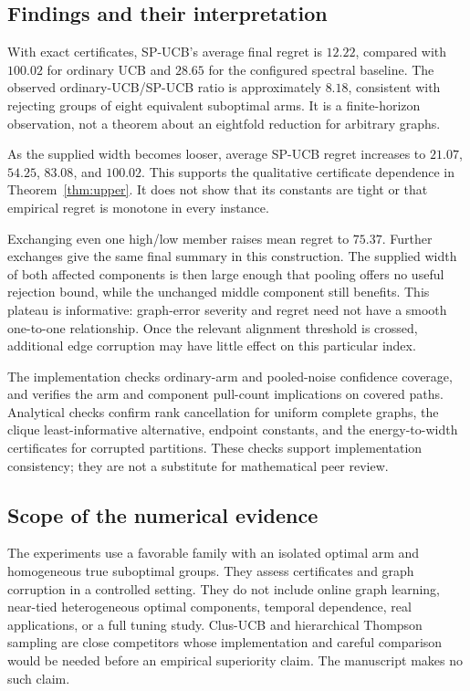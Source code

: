 \documentclass[11pt]{article}
\begin{document}
\subsection{Findings and their interpretation}
With exact certificates, SP-UCB's average final regret is $12.22$, compared with $100.02$ for ordinary UCB and $28.65$ for the configured spectral baseline. The observed ordinary-UCB/SP-UCB ratio is approximately $8.18$, consistent with rejecting groups of eight equivalent suboptimal arms. It is a finite-horizon observation, not a theorem about an eightfold reduction for arbitrary graphs.

As the supplied width becomes looser, average SP-UCB regret increases to $21.07$, $54.25$, $83.08$, and $100.02$. This supports the qualitative certificate dependence in Theorem~\ref{thm:upper}. It does not show that its constants are tight or that empirical regret is monotone in every instance.

Exchanging even one high/low member raises mean regret to $75.37$. Further exchanges give the same final summary in this construction. The supplied width of both affected components is then large enough that pooling offers no useful rejection bound, while the unchanged middle component still benefits. This plateau is informative: graph-error severity and regret need not have a smooth one-to-one relationship. Once the relevant alignment threshold is crossed, additional edge corruption may have little effect on this particular index.

The implementation checks ordinary-arm and pooled-noise confidence coverage, and verifies the arm and component pull-count implications on covered paths. Analytical checks confirm rank cancellation for uniform complete graphs, the clique least-informative alternative, endpoint constants, and the energy-to-width certificates for corrupted partitions. These checks support implementation consistency; they are not a substitute for mathematical peer review.

\subsection{Scope of the numerical evidence}
The experiments use a favorable family with an isolated optimal arm and homogeneous true suboptimal groups. They assess certificates and graph corruption in a controlled setting. They do not include online graph learning, near-tied heterogeneous optimal components, temporal dependence, real applications, or a full tuning study. Clus-UCB and hierarchical Thompson sampling are close competitors whose implementation and careful comparison would be needed before an empirical superiority claim. The manuscript makes no such claim.
\end{document}
